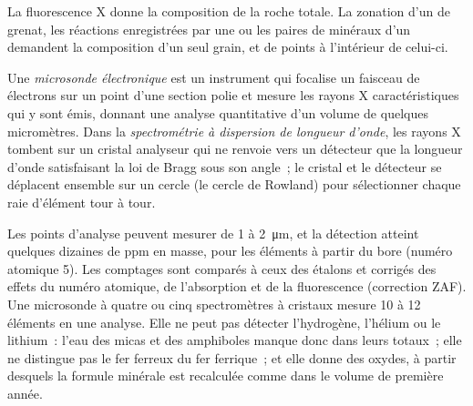 La fluorescence X donne la composition de la roche totale. La zonation d'un  de grenat, les réactions
enregistrées par une  ou les paires de minéraux d'un  demandent la composition d'un seul
grain, et de points à l'intérieur de celui-ci.

\begin{definition}\label{def:b2:field-lab-methods-2:epma}
Une \emph{microsonde électronique} est un instrument qui focalise un faisceau de
électrons sur un point d'une section polie et mesure les rayons X caractéristiques qui y sont émis,
donnant une analyse quantitative d'un volume de quelques micromètres. Dans la
\emph{spectrométrie à dispersion de longueur d'onde}, les rayons X tombent
sur un cristal analyseur qui ne renvoie vers un détecteur que la longueur d'onde satisfaisant la loi de Bragg sous
son angle~; le cristal et le détecteur se déplacent ensemble sur un cercle (le cercle de Rowland) pour sélectionner chaque
raie d'élément tour à tour.
\end{definition}

Les points d'analyse peuvent mesurer de 1 à \qty{2}{\micro\metre}, et la détection atteint quelques dizaines de ppm en
masse, pour les éléments à partir du bore (numéro atomique 5). Les comptages sont comparés à ceux des
étalons et corrigés des effets du numéro atomique, de l'absorption et de la fluorescence (correction
ZAF). Une microsonde à quatre ou cinq spectromètres à cristaux mesure 10 à 12 éléments en une
analyse. Elle ne peut pas détecter l'hydrogène, l'hélium ou le lithium~: l'eau des micas et des amphiboles manque donc
dans leurs totaux~; elle ne distingue pas le fer ferreux du fer ferrique~; et elle donne des oxydes, à partir
desquels la formule minérale est recalculée comme dans le volume de première année.

